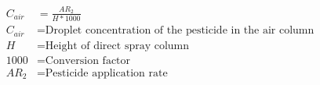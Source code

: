 \documentclass[fleqn, oneside, 11pt]{article}%
\begin{document}
\begin{preview}
\begin{align*}%
C_{air} & = \frac{AR_{2}}{H*1000}\nonumber \\
C_{air} & =  \text{Droplet concentration of the pesticide in the air column} \nonumber \\
H & =  \text{Height of direct spray column} \nonumber \\
1000 & =  \text{Conversion factor} \nonumber \\
AR_{2} & =  \text{Pesticide application rate} \nonumber \\
\end{align*} 
\end{preview}
\end{document}
